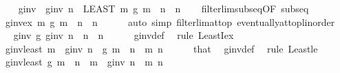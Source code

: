 \begin{isabellebody}
\ \ \isamarkupfalse%
\ g{\isacharunderscore}{\kern0pt}inv\ \ {\isachardoublequoteopen}g{\isacharunderscore}{\kern0pt}inv\ n\ {\isacharequal}{\kern0pt}\ {\isacharparenleft}{\kern0pt}LEAST\ m{\isachardot}{\kern0pt}\ g\ m\ {\isasymge}\ n{\isacharparenright}{\kern0pt}{\isachardoublequoteclose}\ \ n\isanewline
\ \ \isamarkupfalse%
\ filterlim{\isacharunderscore}{\kern0pt}subseq{\isacharbrackleft}{\kern0pt}OF\ subseq{\isacharbrackright}{\kern0pt}\ \isamarkupfalse%
\ g{\isacharunderscore}{\kern0pt}inv{\isacharunderscore}{\kern0pt}ex{\isacharcolon}{\kern0pt}\ {\isachardoublequoteopen}{\isasymexists}m{\isachardot}{\kern0pt}\ g\ m\ {\isasymge}\ n{\isachardoublequoteclose}\ \ n\isanewline
\ \ \ \ \isamarkupfalse%
\ {\isacharparenleft}{\kern0pt}auto\ simp{\isacharcolon}{\kern0pt}\ filterlim{\isacharunderscore}{\kern0pt}at{\isacharunderscore}{\kern0pt}top\ eventually{\isacharunderscore}{\kern0pt}at{\isacharunderscore}{\kern0pt}top{\isacharunderscore}{\kern0pt}linorder{\isacharparenright}{\kern0pt}\isanewline
\ \ \isamarkupfalse%
\ \isamarkupfalse%
\ g{\isacharunderscore}{\kern0pt}inv{\isacharcolon}{\kern0pt}\ {\isachardoublequoteopen}g\ {\isacharparenleft}{\kern0pt}g{\isacharunderscore}{\kern0pt}inv\ n{\isacharparenright}{\kern0pt}\ {\isasymge}\ n{\isachardoublequoteclose}\ \ n\isanewline
\ \ \ \ \isamarkupfalse%
\ g{\isacharunderscore}{\kern0pt}inv{\isacharunderscore}{\kern0pt}def\ \isamarkupfalse%
\ {\isacharparenleft}{\kern0pt}rule\ LeastI{\isacharunderscore}{\kern0pt}ex{\isacharparenright}{\kern0pt}\isanewline
\ \ \isamarkupfalse%
\ g{\isacharunderscore}{\kern0pt}inv{\isacharunderscore}{\kern0pt}least{\isacharcolon}{\kern0pt}\ {\isachardoublequoteopen}m\ {\isasymge}\ g{\isacharunderscore}{\kern0pt}inv\ n{\isachardoublequoteclose}\ \ {\isachardoublequoteopen}g\ m\ {\isasymge}\ n{\isachardoublequoteclose}\ \ m\ n\isanewline
\ \ \ \ \isamarkupfalse%
\ that\ \isamarkupfalse%
\ g{\isacharunderscore}{\kern0pt}inv{\isacharunderscore}{\kern0pt}def\ \isamarkupfalse%
\ {\isacharparenleft}{\kern0pt}rule\ Least{\isacharunderscore}{\kern0pt}le{\isacharparenright}{\kern0pt}\isanewline
\ \ \isamarkupfalse%
\ g{\isacharunderscore}{\kern0pt}inv{\isacharunderscore}{\kern0pt}least{\isacharprime}{\kern0pt}{\isacharcolon}{\kern0pt}\ {\isachardoublequoteopen}g\ m\ {\isacharless}{\kern0pt}\ n{\isachardoublequoteclose}\ \ {\isachardoublequoteopen}m\ {\isacharless}{\kern0pt}\ g{\isacharunderscore}{\kern0pt}inv\ n{\isachardoublequoteclose}\ \ m\ n\isanewline

\end{isabellebody}
